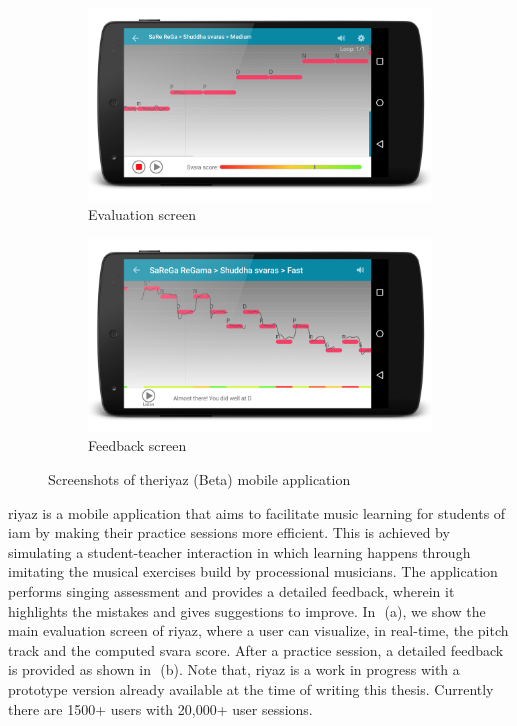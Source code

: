 \begin{figure}
	\begin{subfigure}{\textwidth}
			\centering
		\includegraphics[width=\figSizeSeventy]{ch08_applications/figures/riyaz1.png}
		\caption{Evaluation screen}
		\label{fig:riyaz_evaluation_screen}
	\end{subfigure}
	\begin{subfigure}{\textwidth}
			\centering
		\includegraphics[width=\figSizeSeventy]{ch08_applications/figures/riyaz2.png}
		\caption{Feedback screen}
		\label{fig:riyaz_feedback_screen}
	\end{subfigure}
	\caption{Screenshots of the\gls{riyaz} (Beta) mobile application}
	\label{fig:riyaz_screens}
\end{figure}

\gls{riyaz} is a mobile application that aims to facilitate music learning for students of \gls{iam} by making their practice sessions more efficient. This is achieved by simulating a student-teacher interaction in which learning happens through imitating the musical exercises build by processional musicians. The application performs singing assessment and provides a detailed feedback, wherein it highlights the mistakes and gives suggestions to improve. In~\,(a), we show the main evaluation screen of \gls{riyaz}, where a user can visualize, in real-time, the pitch track and the computed \gls{svara} score. After a practice session, a detailed feedback is provided as shown in~\,(b). Note that, \gls{riyaz} is a work in progress with a prototype version already available at the time of writing this thesis. Currently there are 1500+ users with 20,000+ user sessions. 


